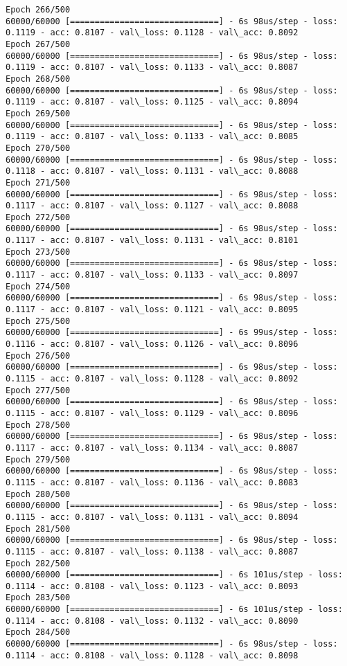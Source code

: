 \documentclass[11pt]{article}
\begin{document}
\begin{Verbatim}[commandchars=\\\{\}]
Epoch 266/500
60000/60000 [==============================] - 6s 98us/step - loss: 0.1119 - acc: 0.8107 - val\_loss: 0.1128 - val\_acc: 0.8092
Epoch 267/500
60000/60000 [==============================] - 6s 98us/step - loss: 0.1119 - acc: 0.8107 - val\_loss: 0.1133 - val\_acc: 0.8087
Epoch 268/500
60000/60000 [==============================] - 6s 98us/step - loss: 0.1119 - acc: 0.8107 - val\_loss: 0.1125 - val\_acc: 0.8094
Epoch 269/500
60000/60000 [==============================] - 6s 98us/step - loss: 0.1119 - acc: 0.8107 - val\_loss: 0.1133 - val\_acc: 0.8085
Epoch 270/500
60000/60000 [==============================] - 6s 98us/step - loss: 0.1118 - acc: 0.8107 - val\_loss: 0.1131 - val\_acc: 0.8088
Epoch 271/500
60000/60000 [==============================] - 6s 98us/step - loss: 0.1117 - acc: 0.8107 - val\_loss: 0.1127 - val\_acc: 0.8088
Epoch 272/500
60000/60000 [==============================] - 6s 98us/step - loss: 0.1117 - acc: 0.8107 - val\_loss: 0.1131 - val\_acc: 0.8101
Epoch 273/500
60000/60000 [==============================] - 6s 98us/step - loss: 0.1117 - acc: 0.8107 - val\_loss: 0.1133 - val\_acc: 0.8097
Epoch 274/500
60000/60000 [==============================] - 6s 98us/step - loss: 0.1117 - acc: 0.8107 - val\_loss: 0.1121 - val\_acc: 0.8095
Epoch 275/500
60000/60000 [==============================] - 6s 99us/step - loss: 0.1116 - acc: 0.8107 - val\_loss: 0.1126 - val\_acc: 0.8096
Epoch 276/500
60000/60000 [==============================] - 6s 98us/step - loss: 0.1115 - acc: 0.8107 - val\_loss: 0.1128 - val\_acc: 0.8092
Epoch 277/500
60000/60000 [==============================] - 6s 98us/step - loss: 0.1115 - acc: 0.8107 - val\_loss: 0.1129 - val\_acc: 0.8096
Epoch 278/500
60000/60000 [==============================] - 6s 98us/step - loss: 0.1117 - acc: 0.8107 - val\_loss: 0.1134 - val\_acc: 0.8087
Epoch 279/500
60000/60000 [==============================] - 6s 98us/step - loss: 0.1115 - acc: 0.8107 - val\_loss: 0.1136 - val\_acc: 0.8083
Epoch 280/500
60000/60000 [==============================] - 6s 98us/step - loss: 0.1115 - acc: 0.8107 - val\_loss: 0.1131 - val\_acc: 0.8094
Epoch 281/500
60000/60000 [==============================] - 6s 98us/step - loss: 0.1115 - acc: 0.8107 - val\_loss: 0.1138 - val\_acc: 0.8087
Epoch 282/500
60000/60000 [==============================] - 6s 101us/step - loss: 0.1114 - acc: 0.8108 - val\_loss: 0.1123 - val\_acc: 0.8093
Epoch 283/500
60000/60000 [==============================] - 6s 101us/step - loss: 0.1114 - acc: 0.8108 - val\_loss: 0.1132 - val\_acc: 0.8090
Epoch 284/500
60000/60000 [==============================] - 6s 98us/step - loss: 0.1114 - acc: 0.8108 - val\_loss: 0.1128 - val\_acc: 0.8098

\end{Verbatim}
\end{document}
